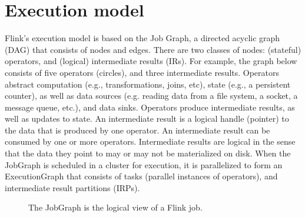 
\section{Execution model}
\label{sec:execution}
 Flink's execution model is based on the Job Graph, a directed acyclic graph (DAG) that consists of nodes and edges. There are two classes of nodes: (stateful) operators, and (logical) intermediate results (IRs). For example, the graph below consists of five operators (circles), and three intermediate results. Operators abstract computation (e.g., transformations, joins, etc), state (e.g., a persistent counter), as well as data sources (e.g. reading data from a file system, a socket, a message queue, etc.), and data sinks. Operators produce intermediate results, as well as updates to state. An intermediate result is a logical handle (pointer) to the data that is produced by one operator. An intermediate result can be consumed by one or more operators. Intermediate results are logical in the sense that the data they point to may or may not be materialized on disk. When the JobGraph is scheduled in a cluster for execution, it is parallelized to form an ExecutionGraph that consists of tasks (parallel instances of operators), and intermediate result partitions (IRPs).

\begin{figure}[ht]
\centering
{}
\label{fig:JobGraph}
\caption{The JobGraph is the logical view of a Flink job.}
\end{figure}


